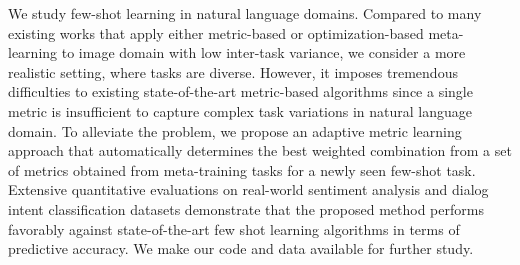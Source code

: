 We study few-shot learning in natural language domains. Compared to many existing works that apply either metric-based or optimization-based meta-learning to image domain with low inter-task variance, we consider a more realistic setting, where tasks are diverse.  However, it imposes tremendous difficulties to existing state-of-the-art metric-based algorithms since a single metric is insufficient to capture complex task variations in natural language domain.   To alleviate the problem, we propose an adaptive metric learning approach that automatically determines the best weighted combination from a set of metrics obtained from meta-training tasks for a newly seen few-shot task.   Extensive quantitative evaluations on real-world sentiment analysis and dialog intent classification datasets demonstrate that the proposed method performs favorably against state-of-the-art few shot learning algorithms in terms of predictive accuracy. We make our code and data available for further study.
